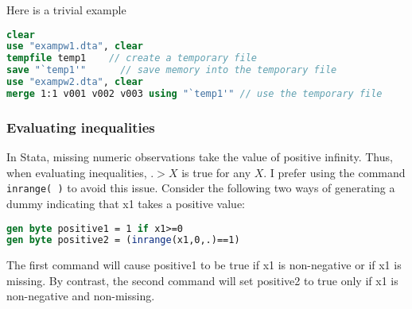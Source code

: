 Here is a trivial example
\begin{lstlisting}[language=Stata]
clear
use "exampw1.dta", clear
tempfile temp1    // create a temporary file
save "`temp1'"      // save memory into the temporary file
use "exampw2.dta", clear
merge 1:1 v001 v002 v003 using "`temp1'" // use the temporary file
\end{lstlisting}

\subsubsection{Evaluating inequalities}
In Stata, missing numeric observations take the value of positive infinity.
Thus, when evaluating inequalities, $.>X$ is true for any $X$.
I prefer using the command \texttt{inrange( )} to avoid this issue.
Consider the following two ways of generating a dummy indicating that x1 takes a positive value:
\begin{lstlisting}[language=Stata]
gen byte positive1 = 1 if x1>=0
gen byte positive2 = (inrange(x1,0,.)==1)
\end{lstlisting}
The first command will cause positive1 to be true if x1 is non-negative or if x1 is missing.
By contrast, the second command will set positive2 to true only if x1 is non-negative and non-missing.


